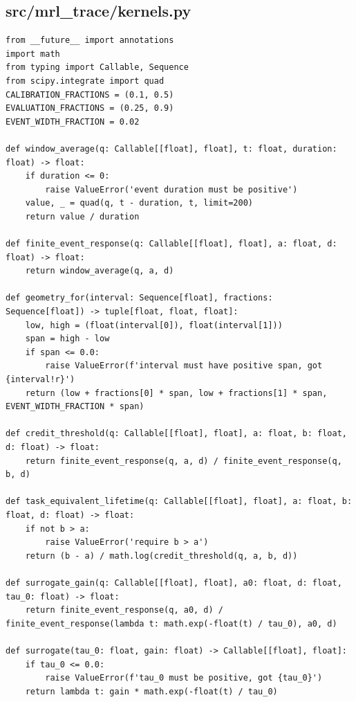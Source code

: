 \documentclass[a4paper,10pt]{article}
\begin{document}
\subsection{src/mrl\_trace/kernels.py}
\begin{Verbatim}
from __future__ import annotations
import math
from typing import Callable, Sequence
from scipy.integrate import quad
CALIBRATION_FRACTIONS = (0.1, 0.5)
EVALUATION_FRACTIONS = (0.25, 0.9)
EVENT_WIDTH_FRACTION = 0.02

def window_average(q: Callable[[float], float], t: float, duration: float) -> float:
    if duration <= 0:
        raise ValueError('event duration must be positive')
    value, _ = quad(q, t - duration, t, limit=200)
    return value / duration

def finite_event_response(q: Callable[[float], float], a: float, d: float) -> float:
    return window_average(q, a, d)

def geometry_for(interval: Sequence[float], fractions: Sequence[float]) -> tuple[float, float, float]:
    low, high = (float(interval[0]), float(interval[1]))
    span = high - low
    if span <= 0.0:
        raise ValueError(f'interval must have positive span, got {interval!r}')
    return (low + fractions[0] * span, low + fractions[1] * span, EVENT_WIDTH_FRACTION * span)

def credit_threshold(q: Callable[[float], float], a: float, b: float, d: float) -> float:
    return finite_event_response(q, a, d) / finite_event_response(q, b, d)

def task_equivalent_lifetime(q: Callable[[float], float], a: float, b: float, d: float) -> float:
    if not b > a:
        raise ValueError('require b > a')
    return (b - a) / math.log(credit_threshold(q, a, b, d))

def surrogate_gain(q: Callable[[float], float], a0: float, d: float, tau_0: float) -> float:
    return finite_event_response(q, a0, d) / finite_event_response(lambda t: math.exp(-float(t) / tau_0), a0, d)

def surrogate(tau_0: float, gain: float) -> Callable[[float], float]:
    if tau_0 <= 0.0:
        raise ValueError(f'tau_0 must be positive, got {tau_0}')
    return lambda t: gain * math.exp(-float(t) / tau_0)


\end{Verbatim}
\end{document}

